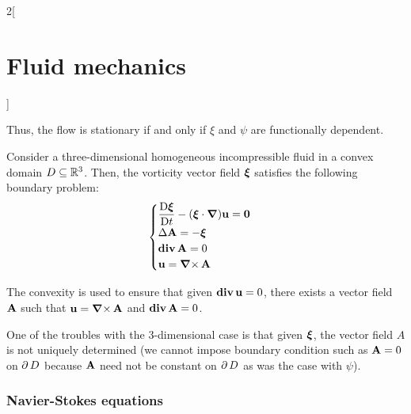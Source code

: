 \documentclass[../../../main_physics.tex]{subfiles}
\begin{document}
\begin{multicols}{2}[\section{Fluid mechanics}]
\begin{remark}
    Thus, the flow is stationary if and only if $\xi$ and $\psi$ are functionally dependent.
  \end{remark}
  \begin{theorem}
    Consider a three-dimensional homogeneous incompressible fluid in a convex domain $D\subseteq \mathbb{R}^3$. Then, the vorticity vector field $\boldsymbol{\mathrm{\xi}}$ satisfies the following boundary problem:
    $$
      \begin{cases}
        \displaystyle \frac{\mathrm{D}\boldsymbol{\mathrm{\xi}}}{\mathrm{D}t} - (\boldsymbol{\mathrm{\xi}}\cdot\grad)\boldsymbol{\mathrm{u}}=\boldsymbol{\mathrm{0}} \\
        \displaystyle \Delta\boldsymbol{\mathrm{A}} = -\boldsymbol{\mathrm{\xi}}                            \\
        \displaystyle \operatorname{\boldsymbol{\mathrm{div}}}\boldsymbol{\mathrm{A}}=0                                            \\
        \displaystyle \boldsymbol{\mathrm{u}}=\operatorname{\boldsymbol{\mathrm{\nabla}}\times}\boldsymbol{\mathrm{A}}
      \end{cases}
    $$
  \end{theorem}
  \begin{remark}
    The convexity is used to ensure that given $\operatorname{\boldsymbol{\mathrm{div}}} \boldsymbol{\mathrm{u}}=0$, there exists a vector field $\boldsymbol{\mathrm{A}}$ such that $\boldsymbol{\mathrm{u}}=\operatorname{\boldsymbol{\mathrm{\nabla}}\times}\boldsymbol{\mathrm{A}}$ and $\operatorname{\boldsymbol{\mathrm{div}}}\boldsymbol{\mathrm{A}}=0$.
  \end{remark}
  \begin{remark}
    One of the troubles with the 3-dimensional case is that given $\boldsymbol{\mathrm{\xi}}$, the vector field $A$ is not uniquely determined (we cannot impose boundary condition such as $\boldsymbol{\mathrm{A}} = 0$ on $\operatorname{\partial}{D}$ because $\boldsymbol{\mathrm{A}}$ need not be constant on $\operatorname{\partial}{D}$ as was the case with $\psi$).
  \end{remark}
  \subsubsection{Navier-Stokes equations}
\end{multicols}
\end{document}
